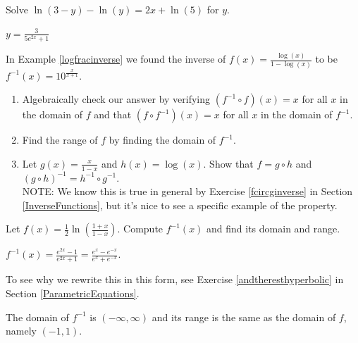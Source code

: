 \documentclass{ximera}
\begin{document}
\begin{problem}
Solve $\ln(3 - y) - \ln(y) = 2x + \ln(5)$ for $y$.

\begin{solution}
$y = \frac{3}{5e^{2x} + 1}$
\end{solution}
\end{problem}

\begin{problem}
In Example \ref{logfracinverse} we found the inverse of $f(x) = \frac{\log(x)}{1-\log(x)}$ to be $f^{-1}(x) = 10^{\frac{x}{x+1}}$.

\begin{enumerate}

\item Algebraically check our answer by verifying  $\left(f^{-1} \circ f\right)(x) = x$ for all $x$ in the domain of $f$ and that $\left(f \circ f^{-1}\right)(x) = x$ for all $x$ in the domain of $f^{-1}$.

\item Find the range of $f$ by finding the domain of $f^{-1}$.

\item Let $g(x) = \frac{x}{1 - x}$ and $h(x) = \log(x)$.  Show that $f = g \circ h$ and $(g \circ h)^{-1} = h^{-1} \circ g^{-1}$.\\


NOTE:  We know this is true in general by Exercise \ref{fcircginverse} in Section \ref{InverseFunctions}, but it's nice to see a specific example of the property.

\end{enumerate}

\end{problem}
 
\begin{problem}\label{inversehyptangent} 
Let $f(x) = \frac{1}{2}\ln\left(\frac{1 + x}{1 - x}\right)$.  Compute $f^{-1}(x)$ and find its domain and range.   

\begin{solution}
$f^{-1}(x) = \frac{e^{2x} - 1}{e^{2x} + 1} = \frac{e^{x} - e^{-x}}{e^{x} + e^{-x}}$. 

To see why we rewrite this in this form, see  Exercise \ref{andtheresthyperbolic} in Section \ref{ParametricEquations}.

 The domain of $f^{-1}$ is $(-\infty, \infty)$ and its range is the same as the domain of $f$, namely $(-1, 1)$.
\end{solution}
\end{problem}
\end{document}
